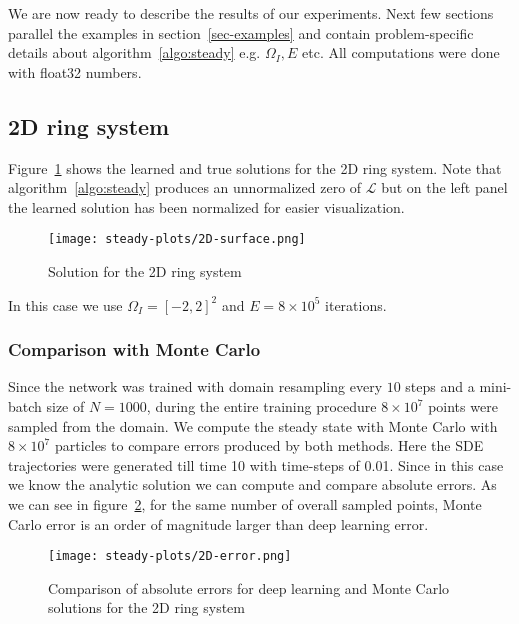 We are now ready to describe the results of our experiments. Next few sections parallel the examples in section~\ref{sec-examples} and contain problem-specific details about algorithm~\ref{algo:steady} e.g. $\Omega_I, E$ etc. All computations were done with float32 numbers.
\subsection{2D ring system}Figure~\ref{fig:2D-surface} shows the learned and true solutions for the 2D ring system. Note that algorithm~\ref{algo:steady} produces an unnormalized zero of $\mathcal L$ but on the left panel the learned solution has been normalized for easier visualization. 
\begin{figure}[!ht]
    \centering
\texttt{[image: steady-plots/2D-surface.png]}
    \caption{Solution for the 2D ring system}
    \label{fig:2D-surface}
\end{figure}
In this case we use $\Omega_I=[-2,2]^2$ and $E=8\times10^5$ iterations. 
\subsubsection{Comparison with Monte Carlo}\label{sssec-MC-comparison} Since the network was trained with domain resampling every $10$ steps and a mini-batch size of $N=1000$, during the entire training procedure $8\times10^7$ points were sampled from the domain. We compute the steady state with Monte Carlo with $8\times10^7$ particles to compare errors produced by both methods. Here the SDE trajectories were generated till time 10 with time-steps of 0.01. Since in this case we know the analytic solution we can compute and compare absolute errors. As we can see in figure~\ref{fig:MC-comparison}, for the same number of overall sampled points, Monte Carlo error is an order of magnitude larger than deep learning error. 

\begin{figure}[!ht]
    \centering
\texttt{[image: steady-plots/2D-error.png]}
\caption{Comparison of absolute errors for deep learning and Monte Carlo solutions for the 2D ring system}
    \label{fig:MC-comparison}
\end{figure}

